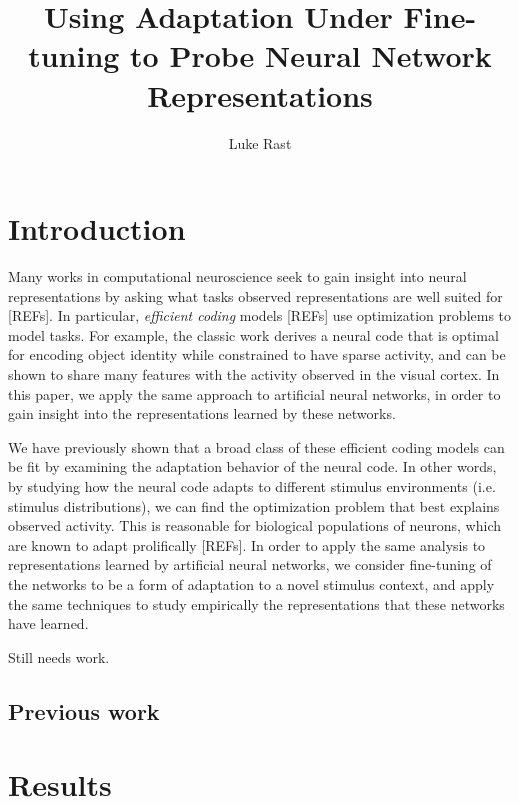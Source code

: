 \documentclass[10pt, twocolumn]{article}      %
\begin{document}
\title{Using Adaptation Under Fine-tuning to Probe Neural Network Representations}
\author{Luke Rast}
\maketitle
\linenumbers


\section{Introduction}


Many works in computational neuroscience seek to gain insight into neural representations by asking what tasks observed representations are well suited for \cite{yamins_using_2016}[REFs].
In particular, \textit{efficient coding} models \cite{olshausen_emergence_1996,yamins_performance-optimized_2014}[REFs] use optimization problems to model tasks.
For example, the classic work \cite{olshausen_emergence_1996} derives a neural code that is optimal for encoding object identity while constrained to have sparse activity, and can be shown to share many features with the activity observed in the visual cortex.
In this paper, we apply the same approach to artificial neural networks, in order to gain insight into the representations learned by these networks.


We have previously shown \cite{rast_adaptation_2020} that a broad class of these efficient coding models can be fit by examining the adaptation behavior of the neural code. 
In other words, by studying how the neural code adapts to different stimulus environments (i.e. stimulus distributions), we can find the optimization problem that best explains observed activity.
This is reasonable for biological populations of neurons, which are known to adapt prolifically [REFs].
In order to apply the same analysis to representations learned by artificial neural networks, we consider fine-tuning of the networks to be a form of adaptation to a novel stimulus context, and apply the same techniques to study empirically the representations that these networks have learned.

Still needs work.


\subsection{Previous work}


\section{Results}
\end{document}
